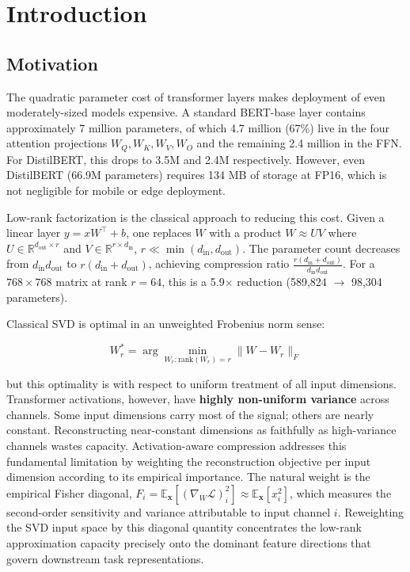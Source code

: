 
\section{Introduction}

\subsection{Motivation}

The quadratic parameter cost of transformer layers makes deployment of even 
moderately-sized models expensive. A standard BERT-base layer contains 
approximately 7 million parameters, of which 4.7 million (67\%) live in the 
four attention projections $W_Q, W_K, W_V, W_O$ and the remaining 2.4 million 
in the FFN. For DistilBERT, this drops to 3.5M and 2.4M respectively. However, 
even DistilBERT (66.9M parameters) requires 134 MB of storage at FP16, which 
is not negligible for mobile or edge deployment.

Low-rank factorization is the classical approach to reducing this cost. Given 
a linear layer $y = x W^\top + b$, one replaces $W$ with a product $W \approx U V$ 
where $U \in \mathbb{R}^{d_\text{out} \times r}$ and $V \in \mathbb{R}^{r \times d_\text{in}}$, 
$r \ll \min(d_\text{in}, d_\text{out})$. The parameter count decreases from 
$d_\text{in} d_\text{out}$ to $r(d_\text{in} + d_\text{out})$, achieving 
compression ratio $\frac{r(d_\text{in} + d_\text{out})}{d_\text{in} d_\text{out}}$. 
For a $768 \times 768$ matrix at rank $r = 64$, this is a 5.9$\times$ reduction 
(589,824 $\to$ 98,304 parameters).

Classical SVD is optimal in an unweighted Frobenius norm sense:

\[
W_r^* = \arg\min_{W_r : \text{rank}(W_r) = r} \|W - W_r\|_F
\tag{1.1}
\]

but this optimality is with respect to uniform treatment of all input 
dimensions. Transformer activations, however, have \textbf{highly non-uniform 
variance} across channels. Some input dimensions carry most of the signal; 
others are nearly constant. Reconstructing near-constant dimensions as faithfully as high-variance channels wastes capacity.
Activation-aware compression addresses this fundamental limitation by weighting the reconstruction 
objective per input dimension according to its empirical importance. The natural weight is the empirical Fisher 
diagonal, $F_i = \mathbb{E}_{\mathbf{x}} [(\nabla_{W} \mathcal{L})_{i}^2] \approx \mathbb{E}_{\mathbf{x}}[x_i^2]$, 
which measures the second-order sensitivity and variance attributable to input channel $i$. 
Reweighting the SVD input space by this diagonal quantity concentrates the low-rank approximation 
capacity precisely onto the dominant feature directions that govern downstream task representations.

